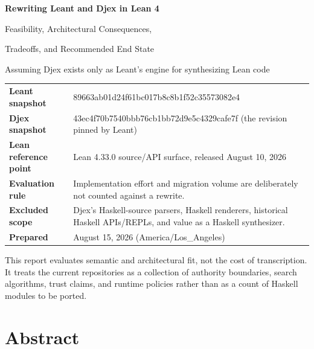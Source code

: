 \documentclass[10pt,letterpaper,oneside]{report}
\newcommand{\commitid}[1]{{\ttfamily\footnotesize #1}}
\begin{document}
\hypersetup{pageanchor=false}
\begin{titlepage}
\centering
\vspace*{0.52in}
{\Huge\bfseries\color{Ink} Rewriting Leant and Djex in Lean 4\par}
\vspace{0.18in}
{\LARGE\color{Navy} Feasibility, Architectural Consequences,\par
Tradeoffs, and Recommended End State\par}
\vspace{0.22in}
{\large Assuming Djex exists only as Leant's engine for synthesizing Lean code\par}
\vspace{0.65in}
\begin{tcolorbox}[width=0.9\textwidth,colback=PaleGray,colframe=RuleGray,boxrule=0.7pt,arc=1mm]
\small
\begin{tabularx}{\textwidth}{@{}L{0.21\textwidth}Y@{}}
\textbf{Leant snapshot} & \commitid{89663ab01d24f61bc017b8c8b1f52c35573082e4} \\
\textbf{Djex snapshot} & \commitid{43ec4f70b7540bbb76cb1bb72d9e5c4329cafe7f} (the revision pinned by Leant) \\
\textbf{Lean reference point} & Lean 4.33.0 source/API surface, released August 10, 2026 \\
\textbf{Evaluation rule} & Implementation effort and migration volume are deliberately not counted against a rewrite. \\
\textbf{Excluded scope} & Djex's Haskell-source parsers, Haskell renderers, historical Haskell APIs/REPLs, and value as a Haskell synthesizer. \\
\textbf{Prepared} & August 15, 2026 (America/Los\_Angeles) \\
\end{tabularx}
\end{tcolorbox}
\vfill
\vspace{0.22in}
{\small This report evaluates semantic and architectural fit, not the cost of transcription. It treats the current repositories as a collection of authority boundaries, search algorithms, trust claims, and runtime policies rather than as a count of Haskell modules to be ported.\par}
\end{titlepage}
\clearpage
\hypersetup{pageanchor=true}

\chapter*{Abstract}
\end{document}
